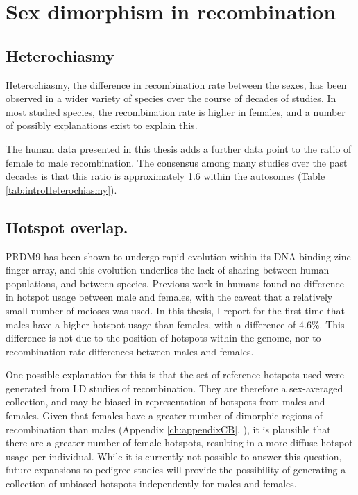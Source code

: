 \section{Sex dimorphism in recombination}

\subsection{Heterochiasmy}

Heterochiasmy, the difference in recombination rate between the sexes, has been observed in a wider variety of species over the course of decades of studies.
In most studied species, the recombination rate is higher in females, and a number of possibly explanations exist to explain this.

The human data presented in this thesis adds a further data point to the ratio of female to male recombination.
The consensus among many studies over the past decades is that this ratio is approximately 1.6 within the autosomes (Table \ref{tab:introHeterochiasmy}).

\subsection{Hotspot overlap.}

PRDM9 has been shown to undergo rapid evolution within its DNA-binding zinc finger array\cite{Oliver2009,Ponting2011}, and this evolution underlies the lack of sharing between human populations\cite{Hinch2011}, and between species\cite{Auton2012a}.
Previous work in humans found no difference in hotspot usage between male and females\cite{Coop2008}, with the caveat that a relatively small number of meioses was used.
In this thesis, I report for the first time that males have a higher hotspot usage than females, with a difference of 4.6\%.
This difference is not due to the position of hotspots within the genome, nor to recombination rate differences between males and females.

One possible explanation for this is that the set of reference hotspots used were generated from LD studies of recombination\cite{Myers2005,hapmap2007}.
They are therefore a sex-averaged collection, and may be biased in representation of hotspots from males and females.
Given that females have a greater number of dimorphic regions of recombination than males (Appendix \ref{ch:appendixCB}, \citet{Bherer2016}), it is plausible that there are a greater number of female hotspots, resulting in a more diffuse hotspot usage per individual.
While it is currently not possible to answer this question, future expansions to pedigree studies will provide the possibility of generating a collection of unbiased hotspots independently for males and females.


